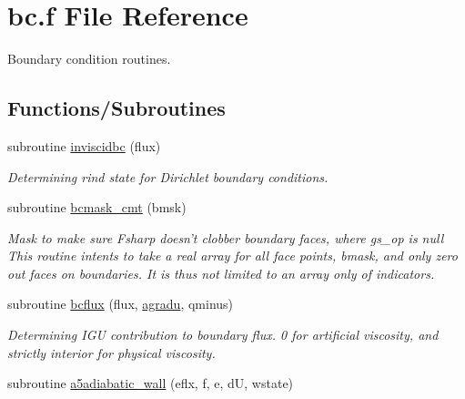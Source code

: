 \hypertarget{bc_8f}{\section{bc.\-f File Reference}
\label{bc_8f}
}


Boundary condition routines.  


\subsection*{Functions/\-Subroutines}
\begin{DoxyCompactItemize}
\item 
\hypertarget{group__bcond_ga45475eec850fc7ef33c51a25b4f86602}{subroutine \hyperlink{group__bcond_ga45475eec850fc7ef33c51a25b4f86602}{inviscidbc} (flux)}\label{group__bcond_ga45475eec850fc7ef33c51a25b4f86602}

\begin{DoxyCompactList}\small\item\em Determining rind state for Dirichlet boundary conditions. \end{DoxyCompactList}\item 
\hypertarget{group__bcond_ga917af547cc29afcf40e2b54c6a97c90d}{subroutine \hyperlink{group__bcond_ga917af547cc29afcf40e2b54c6a97c90d}{bcmask\-\_\-cmt} (bmsk)}\label{group__bcond_ga917af547cc29afcf40e2b54c6a97c90d}

\begin{DoxyCompactList}\small\item\em Mask to make sure Fsharp doesn't clobber boundary faces, where gs\-\_\-op is null This routine intents to take a real array for all face points, bmask, and only zero out faces on boundaries. It is thus not limited to an array only of indicators. \end{DoxyCompactList}\item 
\hypertarget{group__bcond_ga73b8f242bb8ea95b0c7baf512eeac825}{subroutine \hyperlink{group__bcond_ga73b8f242bb8ea95b0c7baf512eeac825}{bcflux} (flux, \hyperlink{group__vfjac_ga9087d56c6c467d3ffeb9aa6be3f43e82}{agradu}, qminus)}\label{group__bcond_ga73b8f242bb8ea95b0c7baf512eeac825}

\begin{DoxyCompactList}\small\item\em Determining I\-G\-U contribution to boundary flux. 0 for artificial viscosity, and strictly interior for physical viscosity. \end{DoxyCompactList}\item 
\hypertarget{group__bcond_ga9a5825c588243a1c261d107376f5a873}{subroutine \hyperlink{group__bcond_ga9a5825c588243a1c261d107376f5a873}{a5adiabatic\-\_\-wall} (eflx, f, e, d\-U, wstate)}\label{group__bcond_ga9a5825c588243a1c261d107376f5a873}


\end{DoxyCompactItemize}
